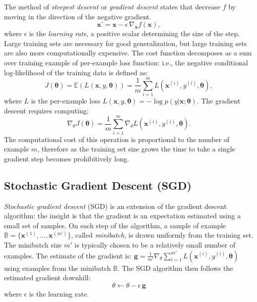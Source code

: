 The method of \textit{steepest descent} or \textit{gradient descent} states that decrease $f$ by moving in the direction of the negative gradient.
\begin{equation}
\textbf{x'} = \textbf{x} - \epsilon\,\nabla_{\mathbf{x}}f(\mathbf{x}),
\end{equation}
where $\epsilon$ is the \textit{learning rate}, a positive scalar determining the size of the step.
Large training sets are necessary for good generalization, but large training sets are also more computationally expensive.
The cost function decomposes as a sum over training example of per-example loss function:
i.e., the negative conditional log-likelihood of the training data is defined as:
\begin{equation}
J(\mathbf{\theta}) = \mathbb{E}(L(\textbf{x}, y, \mathbf{\theta})) = \frac{1}{m} \sum\limits_{i=1}^{m} L(\textbf{x}^{(i)}, y^{(i)}, \mathbf{\theta}),
\end{equation}
where $L$ is the per-example loss $L(\textbf{x}, y, \mathbf{\theta}) = - \log p(y|\textbf{x};\mathbf{\theta})$.
The gradient descent requires computing:
\begin{equation}
\nabla_{\theta} J(\mathbf{\theta}) = \frac{1}{m} \sum\limits_{i=1}^{m} \nabla_{\theta} L(\textbf{x}^{(i)}, y^{(i)}, \mathbf{\theta}).
\end{equation}
The computational cost of this operation is proportional to the number of example $m$, therefore as the training set size grows the time to take a single gradient step becomes prohibitively long.


\subsection{Stochastic Gradient Descent (SGD)}

\textit{Stochastic gradient descent} (SGD) is an extension of the gradient descent algorithm: the insight is that the gradient is an expectation estimated using a small set of samples.
On each step of the algorithm, a sample of example $\mathbb{B} = \{ \textbf{x}^{(1)}, \ldots, \textbf{x}^{(m')}\}$, called \textit{minibatch}, is drawn uniformly from the training set.
The minibatch size $m'$ is typically chosen to be a relatively small number of examples.
The estimate of the gradient is:
$\textbf{g} = \frac{1}{m'} \nabla_{\theta} \sum\limits_{i=1}^{m'} L(\textbf{x}^{(i)}, y^{(i)}, \mathbf{\theta})$
using examples from the minibatch $\mathbb{B}$.
The SGD algorithm then follows the estimated gradient downhill:
\begin{equation}
\theta \leftarrow \theta - \epsilon\,\textbf{g}
\end{equation}
where $\epsilon$ is the learning rate.


